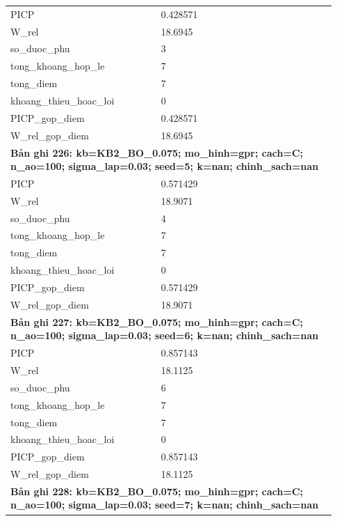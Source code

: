 \begin{longtable}{p{0.43\linewidth}p{0.50\linewidth}}
PICP & 0.428571 \\
W\_\allowbreak rel & 18.6945 \\
so\_\allowbreak duoc\_\allowbreak phu & 3 \\
tong\_\allowbreak khoang\_\allowbreak hop\_\allowbreak le & 7 \\
tong\_\allowbreak diem & 7 \\
khoang\_\allowbreak thieu\_\allowbreak hoac\_\allowbreak loi & 0 \\
PICP\_\allowbreak gop\_\allowbreak diem & 0.428571 \\
W\_\allowbreak rel\_\allowbreak gop\_\allowbreak diem & 18.6945 \\
\midrule
\multicolumn{2}{p{0.95\linewidth}}{\textbf{Bản ghi 226: kb=KB2\_BO\_0.075; mo\_hinh=gpr; cach=C; n\_ao=100; sigma\_lap=0.03; seed=5; k=nan; chinh\_sach=nan}} \\
PICP & 0.571429 \\
W\_\allowbreak rel & 18.9071 \\
so\_\allowbreak duoc\_\allowbreak phu & 4 \\
tong\_\allowbreak khoang\_\allowbreak hop\_\allowbreak le & 7 \\
tong\_\allowbreak diem & 7 \\
khoang\_\allowbreak thieu\_\allowbreak hoac\_\allowbreak loi & 0 \\
PICP\_\allowbreak gop\_\allowbreak diem & 0.571429 \\
W\_\allowbreak rel\_\allowbreak gop\_\allowbreak diem & 18.9071 \\
\midrule
\multicolumn{2}{p{0.95\linewidth}}{\textbf{Bản ghi 227: kb=KB2\_BO\_0.075; mo\_hinh=gpr; cach=C; n\_ao=100; sigma\_lap=0.03; seed=6; k=nan; chinh\_sach=nan}} \\
PICP & 0.857143 \\
W\_\allowbreak rel & 18.1125 \\
so\_\allowbreak duoc\_\allowbreak phu & 6 \\
tong\_\allowbreak khoang\_\allowbreak hop\_\allowbreak le & 7 \\
tong\_\allowbreak diem & 7 \\
khoang\_\allowbreak thieu\_\allowbreak hoac\_\allowbreak loi & 0 \\
PICP\_\allowbreak gop\_\allowbreak diem & 0.857143 \\
W\_\allowbreak rel\_\allowbreak gop\_\allowbreak diem & 18.1125 \\
\midrule
\multicolumn{2}{p{0.95\linewidth}}{\textbf{Bản ghi 228: kb=KB2\_BO\_0.075; mo\_hinh=gpr; cach=C; n\_ao=100; sigma\_lap=0.03; seed=7; k=nan; chinh\_sach=nan}} \\

\end{longtable}
